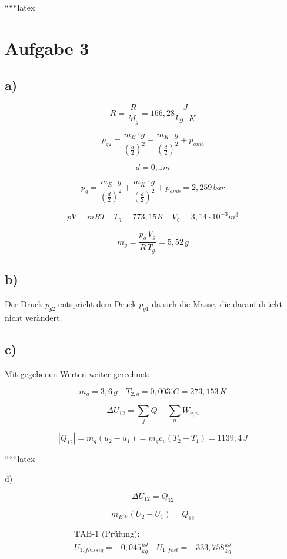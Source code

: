 
``````latex


\section*{Aufgabe 3}

\subsection*{a)}

\[
R = \frac{R}{M_g} = 166{,}28 \frac{J}{kg \cdot K}
\]

\[
p_{g2} = \frac{m_E \cdot g}{\left(\frac{d}{2}\right)^2} + \frac{m_K \cdot g}{\left(\frac{d}{2}\right)^2} + p_{amb}
\]

\[
d = 0{,}1m
\]

\[
p_{g} = \frac{m_E \cdot g}{\left(\frac{d}{2}\right)^2} + \frac{m_K \cdot g}{\left(\frac{d}{2}\right)^2} + p_{amb} = 2{,}259 \, bar
\]

\[
pV = mRT \quad T_g = 773{,}15K \quad V_g = 3{,}14 \cdot 10^{-3} m^3
\]

\[
m_g = \frac{p_g \, V_g}{R \, T_g} = 5{,}52 \, g
\]

\subsection*{b)}

Der Druck $p_{g2}$ entspricht dem Druck $p_{g1}$ da sich die Masse, die darauf drückt nicht verändert.

\subsection*{c)}

Mit gegebenen Werten weiter gerechnet:

\[
m_g = 3{,}6 \, g \quad T_{2,g} = 0{,}003^\circ C = 273{,}153 \, K
\]

\[
\Delta U_{12} = \sum_j Q - \sum_n W_{v,n}
\]

\[
|Q_{12}| = m_g (u_2 - u_1) = m_g c_v (T_2 - T_1) = 1139{,}4 \, J
\]

``````latex


d)

\[
\Delta U_{12} = Q_{12}
\]

\[
m_{EW} (U_2 - U_1) = Q_{12}
\]

\[
\begin{array}{c}
\text{TAB-1 (Prüfung):} \\
U_{1, flüssig} = -0,045 \frac{kJ}{kg} \quad U_{1, fest} = -333,758 \frac{kJ}{kg}
\end{array}
\]

